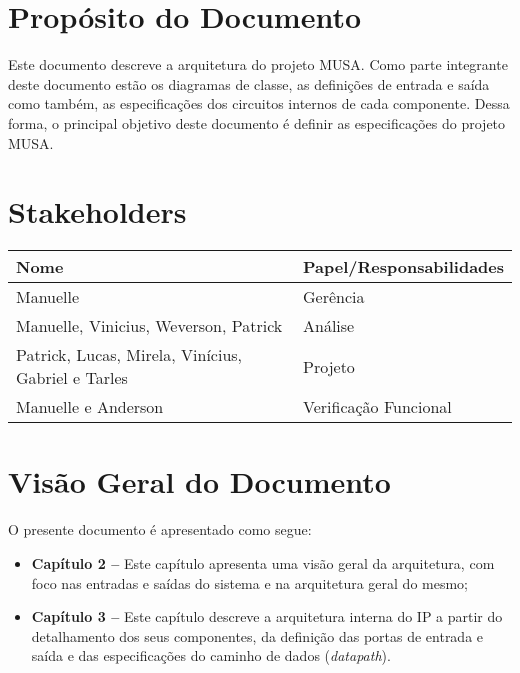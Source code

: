   \section{Propósito do Documento}
  Este documento descreve a arquitetura do projeto MUSA. Como parte integrante deste documento estão os diagramas de classe, as definições de entrada e saída como também, as especificações dos circuitos internos de cada componente. Dessa forma, o principal objetivo deste documento é definir as especificações do projeto MUSA.

  \section{Stakeholders}
    \FloatBarrier
    \begin{table}[H] 
      \begin{center}
        \begin{tabular}[pos]{|m{6cm} | m{8cm}|} 
          \hline 
          \cellcolor[gray]{0.9}\textbf{Nome} & \cellcolor[gray]{0.9}\textbf{Papel/Responsabilidades} \\  
           \hline Manuelle 	& Gerência \\
           \hline Manuelle, Vinicius, Weverson, Patrick 	& Análise \\
           \hline Patrick, Lucas, Mirela, Vinícius, Gabriel e Tarles 	& Projeto \\
           \hline Manuelle e Anderson	& Verificação Funcional \\ \hline
        \end{tabular}
      \end{center}
    \end{table} 

\section{Visão Geral do Documento}

O presente documento é apresentado como segue:

  \begin{itemize}
   \item \textbf{Capítulo 2 --} Este capítulo apresenta uma visão geral da arquitetura, com foco nas entradas e saídas do sistema e na arquitetura geral do mesmo;
   \item \textbf{Capítulo 3 --} Este capítulo descreve a arquitetura interna do IP a partir do detalhamento dos seus componentes, da definição das portas de entrada e saída e das especificações do caminho de dados (\textit{datapath}).
  \end{itemize}

